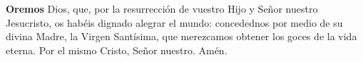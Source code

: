 \textbf{Oremos}
 Dios, que, por la resurrección de vuestro Hijo y Señor nuestro Jesucristo,
os habéis dignado alegrar el mundo: concedednos por medio de su divina Madre, la Virgen Santísima,
que merezcamos obtener los goces de la vida eterna. Por el mismo Cristo, Señor nuestro. Amén.